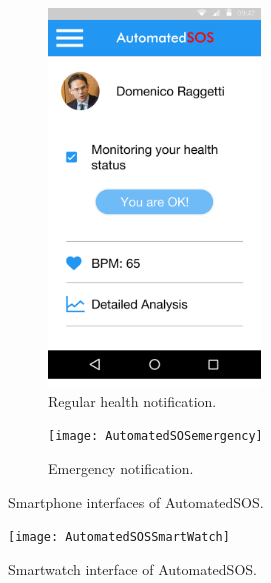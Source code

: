 \documentclass[a4paper]{article}
\begin{document}
\begin{figure}[H]
    \begin{subfigure}{0.5\textwidth}
    \includegraphics[width=160pt]{AutomatedSOS} 
    \caption{Regular health notification.}
    \label{fig:subim1}
    \end{subfigure}
    \begin{subfigure}{0.5\textwidth}
    \texttt{[image: AutomatedSOSemergency]}
    \caption{Emergency notification.}
    \label{fig:subim2}
    \end{subfigure}
\caption{Smartphone interfaces of AutomatedSOS.}
\label{fig:image2}
\end{figure}

\vspace{1cm}

\begin{figure}[H]
    \centering
    \texttt{[image: AutomatedSOSSmartWatch]}
    \caption{Smartwatch interface of AutomatedSOS.}
    \label{fig:my_label}
\end{figure}

\clearpage
\end{document}
